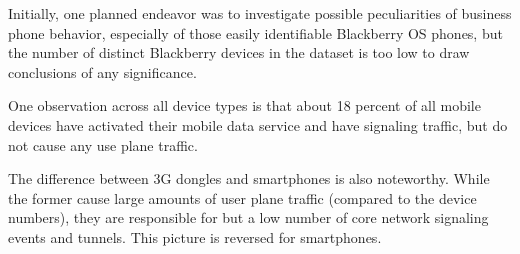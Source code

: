 
Initially, one planned endeavor was to investigate possible peculiarities of business phone behavior, especially of those easily identifiable Blackberry OS phones, but the number of distinct Blackberry devices in the dataset is too low to draw conclusions of any significance.

One observation across all device types is that about 18 percent of all mobile devices have activated their mobile data service and have signaling traffic, but do not cause any use plane traffic.

The difference between 3G dongles and smartphones is also noteworthy. While the former cause large amounts of user plane traffic (compared to the device numbers), they are responsible for but a low number of core network signaling events and tunnels. This picture is reversed for smartphones.


